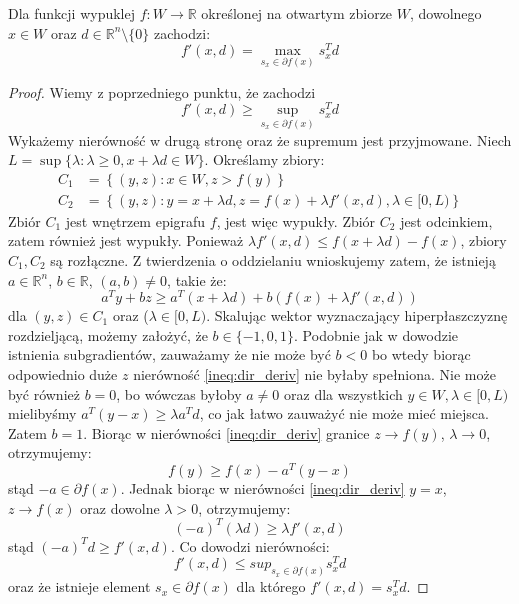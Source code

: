 \documentclass[10pt,a4paper,draft]{report}
\begin{document}
\begin{theorem} \label{thm:dir_deriv_sup}
Dla funkcji wypuklej $f: W \rightarrow \mathbb{R}$ określonej na otwartym zbiorze $W$, dowolnego $x \in W$ oraz $d \in \mathbb{R}^n \setminus \{0\}$ zachodzi:
\[
f'(x, d) = \max_{s_x \in \partial f(x)} s_x^T d 
\]
\end{theorem}
\begin{proof}
Wiemy z poprzedniego punktu, że zachodzi
\[
f'(x, d) \geq \sup_{s_x \in \partial f(x)} s_x^T d 
\]
Wykażemy nierówność w drugą stronę oraz że supremum jest przyjmowane. Niech $L = \sup \{\lambda : \lambda \geq 0, x + \lambda d \in W\}$. Określamy zbiory:
\[
\begin{aligned}
C_1 &= \left\{ (y,z) : x \in W, z > f(y) \right\} \\
C_2 &= \left\{ (y,z) : y = x + \lambda d, z = f(x) + \lambda f'(x,d), \lambda \in [0, L) \right\}
\end{aligned}
\]
Zbiór $C_1$ jest wnętrzem epigrafu $f$, jest więc wypukły. Zbiór $C_2$ jest odcinkiem, zatem również jest wypukły. Ponieważ $\lambda f'(x,d) \leq f(x + \lambda d) - f(x)$, zbiory $C_1, C_2$ są rozłączne. Z twierdzenia o oddzielaniu wnioskujemy zatem, że istnieją $a \in \mathbb{R}^n$, $b \in \mathbb{R}$, $(a,b) \neq 0$, takie że:
\begin{equation}\label{ineq:dir_deriv}
a^T y + bz \geq a^T (x + \lambda d) + b (f(x) + \lambda f'(x,d))
\end{equation}
dla $(y,z) \in C_1$ oraz ($\lambda \in [0, L)$. Skalując wektor wyznaczający hiperpłaszczyznę rozdzieljącą, możemy założyć, że $b \in \{ -1, 0, 1\}$. Podobnie jak w dowodzie istnienia subgradientów, zauważamy że nie może być $b < 0$ bo wtedy biorąc odpowiednio duże $z$ nierówność \ref{ineq:dir_deriv} nie byłaby spełniona. Nie może być również $b = 0$, bo wówczas byłoby $a \neq 0$ oraz dla wszystkich $y \in W, \lambda \in [0, L)$ mielibyśmy $a^T(y - x) \geq \lambda a^T d$, co jak łatwo zauważyć nie może mieć miejsca. Zatem $b = 1$. Biorąc w nierówności \ref{ineq:dir_deriv} granice $z \rightarrow f(y)$, $\lambda \rightarrow 0$, otrzymujemy:
\[
f(y) \geq f(x) - a^T(y - x)
\]
stąd $-a \in \partial f(x)$. Jednak biorąc w nierówności \ref{ineq:dir_deriv} $y = x$, $z \rightarrow f(x)$ oraz dowolne $\lambda > 0$, otrzymujemy:
\[
(-a)^T( \lambda d) \geq \lambda f'(x,d)
\]
stąd $(-a)^T d \geq f'(x,d)$. Co dowodzi nierówności:
\[
f'(x,d) \leq sup_{s_x \in \partial f(x)} s_x^T d 
\]
oraz że istnieje element $s_x \in \partial f(x)$ dla którego $f'(x,d) = s_x^T d$. 
\end{proof}
\end{document}
